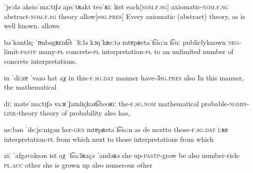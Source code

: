 
              {ˈjeːdə aksioˈmaːtɪʃə apsˈtʀakt teoˈʀiː lɛst}
              {each[\textsc{nom}.\textsc{f}.\textsc{sg}] axiomatic-\textsc{nom}.\textsc{f}.\textsc{sg} abstract-\textsc{nom}.\textsc{f}.\textsc{sg} theory allow[e\textsc{sg}.\textsc{pres}]}
              {{Every} {axiomatic} {(abstract)} theory, {as is well known, allows}}

              {bəˈkantlɪç ˈʊnbəgʀɛn\t{ts}t ˈfiːlə kɔŋˈkʀeːtə ɪntɐpʀetaˈ\t{ts}ioːn \t{ts}uː}
              {{publicly{\textunderscore}known} \textsc{neg}-limit-\textsc{pastp} many-\textsc{pl} concrete-\textsc{pl} interpretation-\textsc{pl} to}
              {{an} {unlimited} {number of} concrete interpretations.}

              {ɪn ˈdiːzɐ ˈvazə hat aχ}
              {in this-\textsc{f}.\textsc{sg}.\textsc{dat} manner have-\textsc{3sg}.\textsc{pres} also}
              {In this manner, {the} {mathematical}}

              {diː mateˈmaːtɪʃə vaːʀˈʃaɪnlɪçkaɪ\t{ts}teoʀiː}
              {the-\textsc{f}.\textsc{sg}.\textsc{nom} mathematical probable-\textsc{nomin}-\textsc{link}-theory}
              {{theory of} {probability} {also has,}}

              {neːbən ˈdeːjeːnɪgən her-\textsc{gen} ɪntɐpʀetaˈ\t{ts}ioːn as de}
              {{next{\textunderscore}to} {those-\textsc{f}.\textsc{sg}.\textsc{dat}} iːʀɐ interpretation-\textsc{pl} from which}
              {{next to} those  interpretations from which}

              {ziː ˈafgəvaksən ɪst aχ ˈ\t{ts}aːlʀaçə ˈandəʀə}
              {she up-\textsc{pastp}-grow be also number-rich-\textsc{pl}.\textsc{acc} other}
              {she is {grown up} also numerous other}
